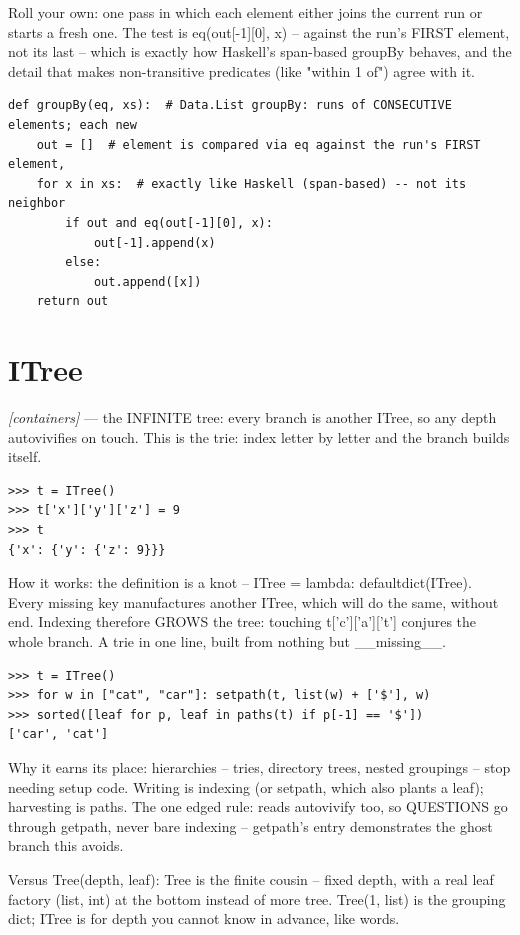 \documentclass[11pt,letterpaper]{book}
\begin{document}
Roll your own: one pass in which each element either joins the current run or starts a fresh one. The test is eq(out[-1][0], x) -- against the run's FIRST element, not its last -- which is exactly how Haskell's span-based groupBy behaves, and the detail that makes non-transitive predicates (like "within 1 of") agree with it.

\begin{lstlisting}[style=code]
def groupBy(eq, xs):  # Data.List groupBy: runs of CONSECUTIVE elements; each new
    out = []  # element is compared via eq against the run's FIRST element,
    for x in xs:  # exactly like Haskell (span-based) -- not its neighbor
        if out and eq(out[-1][0], x):
            out[-1].append(x)
        else:
            out.append([x])
    return out
\end{lstlisting}

\section{ITree}
\noindent\textit{[containers]} --- the INFINITE tree: every branch is another ITree, so any depth autovivifies on touch. This is the trie: index letter by letter and the branch builds itself.
\begin{lstlisting}[style=spec]
>>> t = ITree()
>>> t['x']['y']['z'] = 9
>>> t
{'x': {'y': {'z': 9}}}
\end{lstlisting}

How it works: the definition is a knot -- ITree = lambda: defaultdict(ITree). Every missing key manufactures another ITree, which will do the same, without end. Indexing therefore GROWS the tree: touching t['c']['a']['t'] conjures the whole branch. A trie in one line, built from nothing but \_\_missing\_\_.

\begin{lstlisting}[style=spec]
>>> t = ITree()
>>> for w in ["cat", "car"]: setpath(t, list(w) + ['$'], w)
>>> sorted([leaf for p, leaf in paths(t) if p[-1] == '$'])
['car', 'cat']
\end{lstlisting}

Why it earns its place: hierarchies -- tries, directory trees, nested groupings -- stop needing setup code. Writing is indexing (or setpath, which also plants a leaf); harvesting is paths. The one edged rule: reads autovivify too, so QUESTIONS go through getpath, never bare indexing -- getpath's entry demonstrates the ghost branch this avoids.


Versus Tree(depth, leaf): Tree is the finite cousin -- fixed depth, with a real leaf factory (list, int) at the bottom instead of more tree. Tree(1, list) is the grouping dict; ITree is for depth you cannot know in advance, like words.
\end{document}
